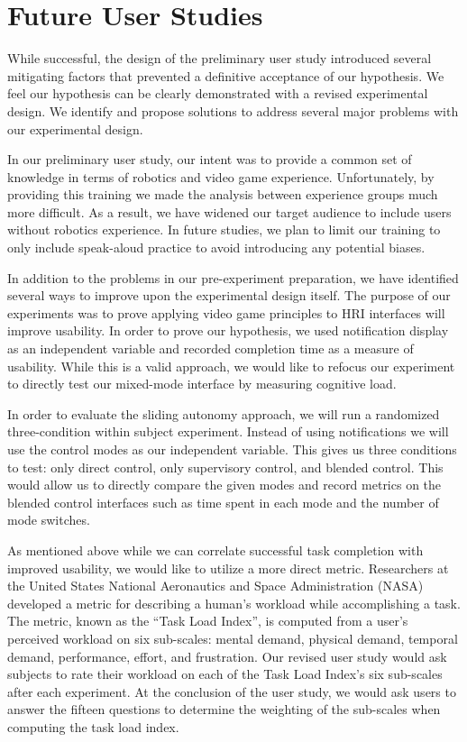 \section{Future User Studies}
\label{sec:futurestudy}
While successful, the design of the preliminary user study introduced several mitigating factors that prevented a definitive acceptance of our hypothesis. We feel our hypothesis can be clearly demonstrated with a revised experimental design. We identify and propose solutions to address several major problems with our experimental design.

In our preliminary user study, our intent was to provide a common set of knowledge in terms of robotics and video game experience. Unfortunately, by providing this training we made the analysis between experience groups much more difficult. As a result, we have widened our target audience to include users without robotics experience. In future studies, we plan to limit our training to only include speak-aloud practice to avoid introducing any potential biases.

In addition to the problems in our pre-experiment preparation, we have identified several ways to improve upon the experimental design itself. The purpose of our experiments was to prove applying video game principles to HRI interfaces will improve usability. In order to prove our hypothesis, we used notification display as an independent variable and recorded completion time as a measure of usability. While this is a valid approach, we would like to refocus our experiment to directly test our mixed-mode interface by measuring cognitive load. 

In order to evaluate the sliding autonomy approach, we will run a randomized three-condition within subject experiment. Instead of using notifications we will use the control modes as our independent variable. This gives us three conditions to test: only direct control, only supervisory control, and blended control. This would allow us to directly compare the given modes and record metrics on the blended control interfaces such as time spent in each mode and the number of mode switches.

As mentioned above while we can correlate successful task completion with improved usability, we would like to utilize a more direct metric. Researchers at the United States National Aeronautics and Space Administration (NASA) developed a metric for describing a human's workload while accomplishing a task. The metric, known as the ``Task Load Index'', is computed from a user's perceived workload on six sub-scales: mental demand, physical demand, temporal demand, performance, effort, and frustration. \cite{NASA_TLX} Our revised user study would ask subjects to rate their workload on each of the Task Load Index's six sub-scales after each experiment. At the conclusion of the user study, we would ask users to answer the fifteen questions to determine the weighting of the sub-scales when computing the task load index. \cite{NASA_TLX20}

